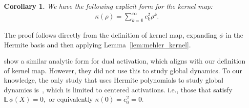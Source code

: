 \documentclass[twoside]{article}
\newcommand{\E}{\mathbb{E}\,}
\newtheorem{corollary}{Corollary}
\theoremstyle{definition}
\newcommand{\thomas}[1]{{\color{blue}\textit{#1}}}
\begin{document}
\begin{corollary}
    \label{cor:hermite_covariance}
    \label{cor:kernel_map}
We have the following explicit form for the kernel map:
\begin{align*}
\kappa(\rho) = \sum_{k=0}^\infty c_k^2 \rho^k.
\end{align*}
\end{corollary}


The proof follows directly from the definition of kernel map, expanding $\phi$ in the Hermite basis and then applying Lemma~\ref{lem:mehler_kernel}. 

\citet{daniely2016toward} show a similar analytic form for dual activation, which aligns with our definition of kernel map. However, they did not use this to study global dynamics. To our knowledge, the only study that uses Hermite polynomials to study global dynamics is~\citep{joudaki2023impact}, which is limited to centered activations. i.e., those that satisfy $\E \phi(X)=0,$ or equivalently $\kappa(0)=c_0^2 = 0.$



\end{document}
